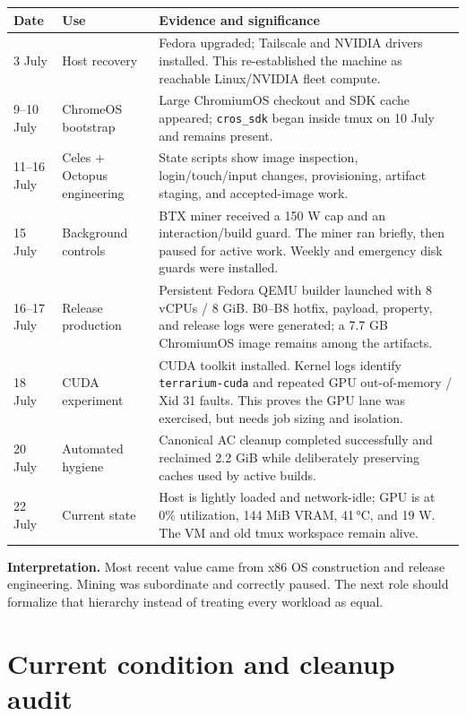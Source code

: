 \documentclass[11pt,letterpaper]{article}
\newcommand{\mono}[1]{\texttt{#1}}
\begin{document}
\begin{longtable}{@{}L{1.05in}L{1.75in}L{3.25in}@{}}
\toprule
\textbf{Date} & \textbf{Use} & \textbf{Evidence and significance} \\
\midrule
{} July & Host recovery & Fedora upgraded; Tailscale and NVIDIA drivers installed. This re-established the machine as reachable Linux/NVIDIA fleet compute. \\
9--10 July & ChromeOS bootstrap & Large ChromiumOS checkout and SDK cache appeared; \mono{cros\_sdk} began inside tmux on 10 July and remains present. \\
11--16 July & Celes + Octopus engineering & State scripts show image inspection, login/touch/input changes, provisioning, artifact staging, and accepted-image work. \\
15 July & Background controls & BTX miner received a 150 W cap and an interaction/build guard. The miner ran briefly, then paused for active work. Weekly and emergency disk guards were installed. \\
16--17 July & Release production & Persistent Fedora QEMU builder launched with 8 vCPUs / 8 GiB. B0--B8 hotfix, payload, property, and release logs were generated; a 7.7 GB ChromiumOS image remains among the artifacts. \\
18 July & CUDA experiment & CUDA toolkit installed. Kernel logs identify \mono{terrarium-cuda} and repeated GPU out-of-memory / Xid 31 faults. This proves the GPU lane was exercised, but needs job sizing and isolation. \\
20 July & Automated hygiene & Canonical AC cleanup completed successfully and reclaimed 2.2 GiB while deliberately preserving caches used by active builds. \\
22 July & Current state & Host is lightly loaded and network-idle; GPU is at 0\% utilization, 144 MiB VRAM, 41\,°C, and 19 W. The VM and old tmux workspace remain alive. \\
\bottomrule
\end{longtable}

\begin{notebox}
\textbf{Interpretation.} Most recent value came from x86 OS construction and release engineering. Mining was subordinate and correctly paused. The next role should formalize that hierarchy instead of treating every workload as equal.
\end{notebox}

\section{Current condition and cleanup audit}
\end{document}
